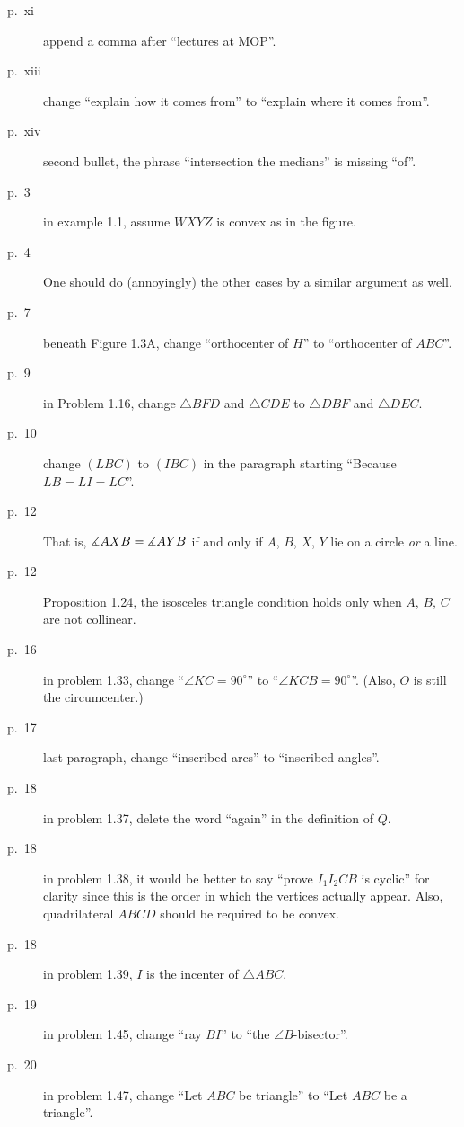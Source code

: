 \documentclass[11pt]{scrartcl}
\begin{document}
\begin{description}

\item[p.\  xi] append a comma after ``lectures at MOP''.
\item[p.\  xiii] change ``explain how it comes from'' to ``explain where it comes from''.
\item[p.\  xiv] second bullet, the phrase ``intersection the medians'' is missing ``of''.
\item[p.\   3] in example 1.1, assume $WXYZ$ is convex as in the figure.
\item[p.\   4] 
  One should do (annoyingly) the other cases by a similar argument as well.
\item[p.\   7] beneath Figure 1.3A, change ``orthocenter of $H$'' to ``orthocenter of $ABC$''.
\item[p.\   9] in Problem 1.16, change $\triangle BFD$ and $\triangle CDE$
  to $\triangle DBF$ and $\triangle DEC$.
\item[p.\  10] change $(LBC)$ to $(IBC)$ in the paragraph starting ``Because $LB=LI=LC$''.
\item[p.\  12] 
  That is, $\measuredangle AXB = \measuredangle AYB$ if and only if $A$, $B$, $X$, $Y$ lie on
  a circle \emph{or} a line.
\item[p.\  12] Proposition 1.24, the isosceles triangle condition holds
  only when $A$, $B$, $C$ are not collinear.
\item[p.\  16] in problem 1.33, change ``$\angle KC=90^{\circ}$'' to ``$\angle KCB=90^{\circ}$''.
  (Also, $O$ is still the circumcenter.)
\item[p.\  17] last paragraph, change ``inscribed arcs'' to ``inscribed angles''.
\item[p.\  18] in problem 1.37, delete the word ``again'' in the definition of $Q$.
\item[p.\  18] in problem 1.38, it would be better to say
  ``prove $I_1 I_2 C B$ is cyclic'' for clarity
  since this is the order in which the vertices actually appear.
  Also, quadrilateral $ABCD$ should be required to be convex.
\item[p.\  18] in problem 1.39, $I$ is the incenter of $\triangle ABC$.
\item[p.\  19] in problem 1.45, change ``ray $BI$'' to ``the $\angle B$-bisector''.
\item[p.\  20] in problem 1.47, change ``Let $ABC$ be triangle'' to ``Let $ABC$ be a triangle''.

\end{description}
\end{document}
